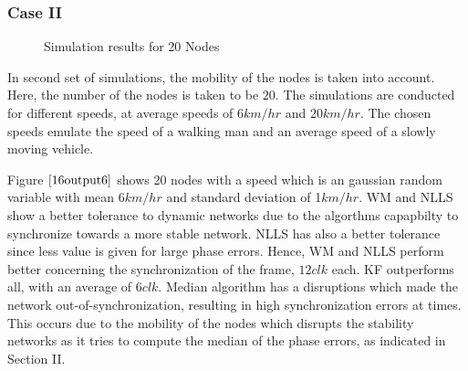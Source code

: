 \documentclass[journal]{IEEEtran}
\begin{document}
\subsubsection{\textbf{Case II}}
\begin{figure}
\centerline{
 \hfil {}} \caption{Simulation results for 20 Nodes}
\label{16output}
\end{figure}
In second set of simulations, the mobility of the nodes is taken into account. Here, the number of the nodes is taken to be $20$. The simulations are conducted for different speeds, at average speeds of $6km/hr$ and $20km/hr$. The chosen speeds emulate the speed of a walking man and an average speed of a slowly moving vehicle.
\par
Figure $\ref{16output6}$ shows 20 nodes with a speed which is an gaussian random variable with mean $6km/hr$ and standard
deviation of 1$km/hr$. WM and NLLS show a better tolerance to dynamic networks due to the algorthms capapbilty to synchronize towards a more stable network. NLLS has also a better tolerance since less value is given for large phase errors. Hence, WM and NLLS perform
better concerning the synchronization of the frame, $12 clk$ each. KF outperforms all, with an average of $6 clk$. Median algorithm has a disruptions which made the network out-of-synchronization, resulting in high synchronization errors at times. This occurs due to the mobility of the nodes which disrupts the stability networks as it tries to compute the median of the phase errors, as indicated in Section II.
\end{document}
